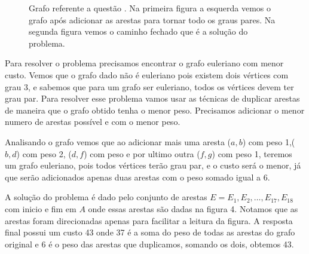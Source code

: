 \documentclass[a4paper,12pt]{article}
\begin{document}
	\begin{figure}[!ht]
		\centering
		\caption{Grafo referente a questão \thesection. Na primeira figura a esquerda vemos o grafo após adicionar as arestas para tornar todo os graus pares. Na segunda figura vemos o caminho fechado que é a solução do problema.}
	\end{figure}

	Para resolver o problema precisamos encontrar o grafo euleriano com menor custo. Vemos que o grafo dado não é euleriano pois existem dois vértices com grau 3, e sabemos que para um grafo ser euleriano, todos os vértices devem ter grau par. Para resolver esse problema vamos usar as técnicas de duplicar arestas de maneira que o grafo obtido tenha o menor peso. Precisamos adicionar o menor numero de arestas possível e com o menor peso.

	Analisando o grafo vemos que ao adicionar mais uma aresta ($a,b$) com peso 1,($b,d$) com peso 2, ($d,f$) com peso e por ultimo outra ($f,g$) com peso 1, teremos um grafo euleriano, pois todos vértices terão grau par, e o custo será o menor, já que serão adicionados apenas duas arestas com o peso somado igual a 6.

	A solução do problema é dado pelo conjunto de arestas $E = {E_1, E_2, \ldots , E_{17}, E_{18}}$ com inicio e fim em $A$ onde essas arestas são dadas na figura 4. Notamos que as arestas foram direcionadas apenas para facilitar a leitura da figura. A resposta final possui um custo 43 onde 37 é a soma do peso de todas as arestas do grafo original e 6 é o peso das arestas que duplicamos, somando os dois, obtemos 43.
\end{document}
